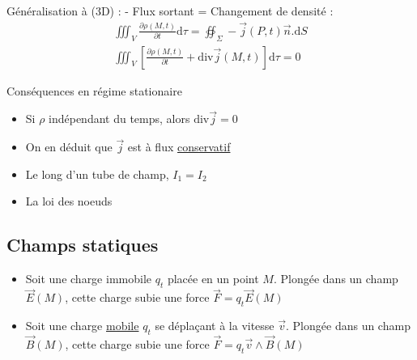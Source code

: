 \begin{myproof}{}{}
      Généralisation à (3D) : - Flux sortant = Changement de densité : 
      \begin{gather}
        \iiint _ V \frac{\partial \rho(M,t)}{\partial t}  \mathrm{d} \tau = \oiint _ \Sigma - \overrightarrow{j}(P,t) \overrightarrow{n} . \mathrm{d} S \\  
        \iiint _ V \left[ \frac{\partial \rho(M,t)}{\partial t}  + \mathrm{div} \overrightarrow{j}(M,t) \right] \mathrm{d} \tau = 0
      \end{gather}
\end{myproof}



\begin{Prop}{Conséquences en régime stationaire}{}

  \begin{itemize}

      \item Si $\rho$ indépendant du temps, alors $\mathrm{div} \overrightarrow{j} = 0$
      \item On en déduit que $\overrightarrow{j}$ est à flux \underline{conservatif}
      \item Le long d'un tube de champ, $I_1 = I_2$ 
      \item La loi des noeuds

  \end{itemize}

\end{Prop}


\subsection{Champs statiques} %
\label{sub:Champs statiques}

\begin{itemize}

    \item Soit une charge immobile $q_t$ placée en un point $M$. Plongée dans un champ $\overrightarrow{E}(M)$, cette charge subie une force $\overrightarrow{F} = q_t \overrightarrow{E}(M)$
    \item Soit une charge \underline{mobile} $q_t$ se déplaçant à la vitesse $\overrightarrow{v}$. Plongée dans un champ $\overrightarrow{B}(M)$, cette charge subie une force $\overrightarrow{F} = q_t \overrightarrow{v} \wedge\overrightarrow{B}(M)$

\end{itemize}


